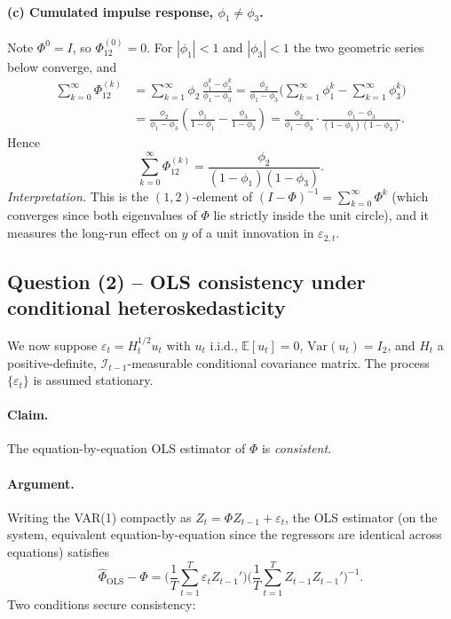 \documentclass[12pt]{article}
\newcommand{\E}{\mathbb{E}}
\newcommand{\Var}{\mathrm{Var}}
\newcommand{\Info}{\mathcal{I}}
\begin{document}
\paragraph{(c) Cumulated impulse response, $\phi_1\neq\phi_3$.} Note $\Phi^{0}=I$, so $\Phi^{(0)}_{12}=0$. For $|\phi_1|<1$ and $|\phi_3|<1$ the two geometric series below converge, and
\begin{align*}
\sum_{k=0}^{\infty}\Phi^{(k)}_{12}
&= \sum_{k=1}^{\infty}\phi_2\,\frac{\phi_1^{k}-\phi_3^{k}}{\phi_1-\phi_3}
= \frac{\phi_2}{\phi_1-\phi_3}\Bigg(\sum_{k=1}^{\infty}\phi_1^{k}-\sum_{k=1}^{\infty}\phi_3^{k}\Bigg)\\
&= \frac{\phi_2}{\phi_1-\phi_3}\!\left(\frac{\phi_1}{1-\phi_1}-\frac{\phi_3}{1-\phi_3}\right)
= \frac{\phi_2}{\phi_1-\phi_3}\cdot\frac{\phi_1-\phi_3}{(1-\phi_1)(1-\phi_3)}.
\end{align*}
Hence
\begin{equation}
\sum_{k=0}^{\infty}\Phi^{(k)}_{12} = \frac{\phi_2}{(1-\phi_1)(1-\phi_3)}.\label{eq:cumIRF}
\end{equation}
\textit{Interpretation.} This is the $(1,2)$-element of $(I-\Phi)^{-1}=\sum_{k=0}^{\infty}\Phi^{k}$ (which converges since both eigenvalues of $\Phi$ lie strictly inside the unit circle), and it measures the long-run effect on $y$ of a unit innovation in $\varepsilon_{2,t}$.

\subsection*{Question (2) -- OLS consistency under conditional heteroskedasticity}\label{sec:p3-q2}

We now suppose $\varepsilon_t=H_t^{1/2}u_t$ with $u_t$ i.i.d., $\E[u_t]=0$, $\Var(u_t)=I_2$, and $H_t$ a positive-definite, $\Info_{t-1}$-measurable conditional covariance matrix. The process $\{\varepsilon_t\}$ is assumed stationary.

\paragraph{Claim.} The equation-by-equation OLS estimator of $\Phi$ is \emph{consistent}.

\paragraph{Argument.} Writing the VAR(1) compactly as $Z_t = \Phi Z_{t-1}+\varepsilon_t$, the OLS estimator (on the system, equivalent equation-by-equation since the regressors are identical across equations) satisfies
\begin{equation*}
\widehat{\Phi}_{\text{OLS}} - \Phi
= \Bigg(\frac{1}{T}\sum_{t=1}^{T} \varepsilon_t Z_{t-1}'\Bigg)\Bigg(\frac{1}{T}\sum_{t=1}^{T} Z_{t-1}Z_{t-1}'\Bigg)^{-1}.
\end{equation*}
Two conditions secure consistency:
\end{document}
